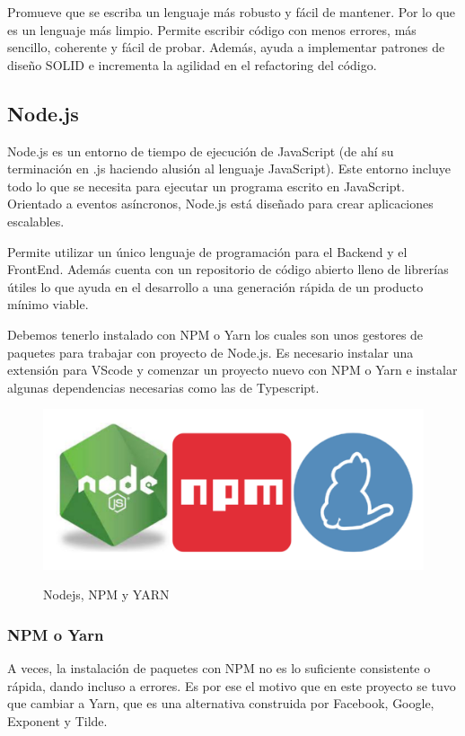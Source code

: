 \documentclass[12pt,twoside,titlepage]{report}
\begin{document}
Promueve que se escriba un lenguaje más robusto y fácil de mantener. Por lo que es un lenguaje más limpio. Permite escribir código con menos errores, más sencillo, coherente y fácil de probar. Además, ayuda a implementar patrones de diseño SOLID e incrementa la agilidad en el refactoring del código.

\subsection{Node.js}

Node.js es un entorno de tiempo de ejecución de JavaScript (de ahí su terminación en .js haciendo alusión al lenguaje JavaScript). Este entorno incluye todo lo que se necesita para ejecutar un programa escrito en JavaScript. Orientado a eventos asíncronos, Node.js está diseñado para crear aplicaciones escalables.

Permite utilizar un único lenguaje de programación para el Backend y el FrontEnd. Además cuenta con un repositorio de código abierto lleno de librerías útiles lo que ayuda en el desarrollo a una generación rápida de un producto mínimo viable.

Debemos tenerlo instalado con NPM o Yarn los cuales son unos gestores de paquetes para trabajar con proyecto de Node.js. Es necesario instalar una extensión para VScode y comenzar un proyecto nuevo con NPM o Yarn e instalar algunas dependencias necesarias como las de Typescript.

\begin{figure}[H]
    \centering
    \includegraphics[scale=0.1]{Nodejs/NodeNPMYarn}
    \label{fig:NodeNPMYarn}
    \caption{Nodejs, NPM y YARN}
\end{figure}

\subsubsection{NPM o Yarn}

A veces, la instalación de paquetes con NPM no es lo suficiente consistente o rápida, dando incluso a errores. Es por ese el motivo que en este proyecto se tuvo que cambiar a Yarn, que es una alternativa construida por Facebook, Google, Exponent y Tilde.
\end{document}
